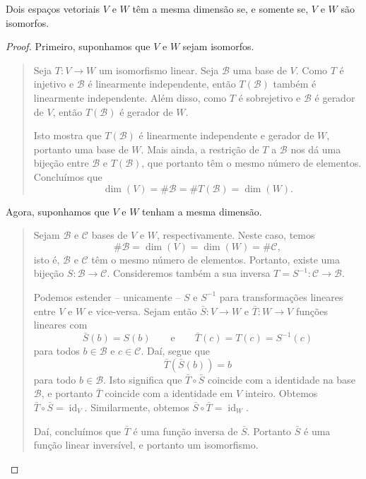 \begin{theorem}
	Dois espaços vetoriais $V$ e $W$ têm a mesma dimensão se, e somente se, $V$ e $W$ são isomorfos.
\end{theorem}

\begin{proof}
	Primeiro, suponhamos que $V$ e $W$ sejam isomorfos.
	
	\begin{quote}
		Seja $T\colon V\to W$ um isomorfismo linear. Seja $\mathcal{B}$ uma base de $V$. Como $T$ é injetivo e $\mathcal{B}$ é linearmente independente, então $T(\mathcal{B})$ também é linearmente independente. Além disso, como $T$ é sobrejetivo e $\mathcal{B}$ é gerador de $V$, então $T(\mathcal{B})$ é gerador de $W$.
		
		Isto mostra que $T(\mathcal{B})$ é linearmente independente e gerador de $W$, portanto uma base de $W$. Mais ainda, a restrição de $T$ a $\mathcal{B}$ nos dá uma bijeção entre $\mathcal{B}$ e $T(\mathcal{B})$, que portanto têm o mesmo número de elementos. Concluímos que
		\[\dim(V)=\#\mathcal{B}=\#T(\mathcal{B})=\dim(W).\]
	\end{quote}
	
	Agora, suponhamos que $V$ e $W$ tenham a mesma dimensão.
	
	\begin{quote}
		Sejam $\mathcal{B}$ e $\mathcal{C}$ bases de $V$ e $W$, respectivamente. Neste caso, temos
		\[\#\mathcal{B}=\dim(V)=\dim(W)=\#\mathcal{C},\]
		isto é, $\mathcal{B}$ e $\mathcal{C}$ têm o mesmo número de elementos. Portanto, existe uma bijeção $S\colon\mathcal{B}\to\mathcal{C}$. Consideremos também a sua inversa $T=S^{-1}\colon\mathcal{C}\to\mathcal{B}$.
		
		Podemos estender -- unicamente -- $S$ e $S^{-1}$ para transformações lineares entre $V$ e $W$ e vice-versa. Sejam então $\bar{S}\colon V\to W$ e $\bar{T}\colon W\to V$ funções lineares com
		\[\bar{S}(b)=S(b)\qquad\text{e}\qquad\bar{T}(c)=T(c)=S^{-1}(c)\]
		para todos $b\in\mathcal{B}$ e $c\in\mathcal{C}$. Daí, segue que
		\[\bar{T}(\bar{S}(b))=b\]
		para todo $b\in\mathcal{B}$. Isto significa que $\bar{T}\circ\bar{S}$ coincide com a identidade na base $\mathcal{B}$, e portanto $\bar{T}$ coincide com a identidade em $V$ inteiro. Obtemos $\bar{T}\circ\bar{S}=\operatorname{id}_V$. Similarmente, obtemos $\bar{S}\circ\bar{T}=\operatorname{id}_W$.
		
		Daí, concluímos que $\bar{T}$ é uma função inversa de $\bar{S}$. Portanto $\bar{S}$ é uma função linear inversível, e portanto um isomorfismo.
	\end{quote}
\end{proof}